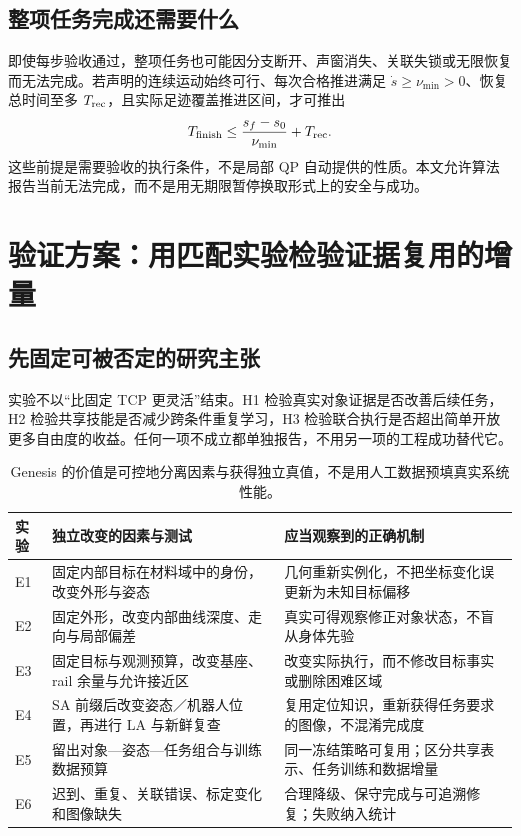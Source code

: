 \documentclass[UTF8,11pt,a4paper,fontset=fandol]{ctexart}
\numberwithin{equation}{section}
\theoremstyle{definition}
\begin{document}
\subsection{整项任务完成还需要什么}
即使每步验收通过，整项任务也可能因分支断开、声窗消失、关联失锁或无限恢复而无法完成。若声明的连续运动始终可行、每次合格推进满足 $\dot s\ge\nu_{\min}>0$、恢复总时间至多 $T_{\rm rec}$，且实际足迹覆盖推进区间，才可推出
\begin{equation}
T_{\rm finish}\le\frac{s_f-s_0}{\nu_{\min}}+T_{\rm rec}.
\label{eq:conditionalfinish}
\end{equation}
这些前提是需要验收的执行条件，不是局部 QP 自动提供的性质。本文允许算法报告当前无法完成，而不是用无期限暂停换取形式上的安全与成功。

\section{验证方案：用匹配实验检验证据复用的增量}
\label{sec:experiments}
\subsection{先固定可被否定的研究主张}
实验不以“比固定 TCP 更灵活”结束。H1 检验真实对象证据是否改善后续任务，H2 检验共享技能是否减少跨条件重复学习，H3 检验联合执行是否超出简单开放更多自由度的收益。任何一项不成立都单独报告，不用另一项的工程成功替代它。

\begin{table}[htbp]\centering\small
\begin{tabularx}{\linewidth}{P{12mm}YY}
\toprule
实验 & 独立改变的因素与测试 & 应当观察到的正确机制\\\midrule
E1 & 固定内部目标在材料域中的身份，改变外形与姿态 & 几何重新实例化，不把坐标变化误更新为未知目标偏移\\
E2 & 固定外形，改变内部曲线深度、走向与局部偏差 & 真实可得观察修正对象状态，不盲从身体先验\\
E3 & 固定目标与观测预算，改变基座、rail 余量与允许接近区 & 改变实际执行，而不修改目标事实或删除困难区域\\
E4 & SA 前缀后改变姿态／机器人位置，再进行 LA 与新鲜复查 & 复用定位知识，重新获得任务要求的图像，不混淆完成度\\
E5 & 留出对象—姿态—任务组合与训练数据预算 & 同一冻结策略可复用；区分共享表示、任务训练和数据增量\\
E6 & 迟到、重复、关联错误、标定变化和图像缺失 & 合理降级、保守完成与可追溯修复；失败纳入统计\\\bottomrule
\end{tabularx}
\caption{Genesis 的价值是可控地分离因素与获得独立真值，不是用人工数据预填真实系统性能。}
\end{table}
\end{document}
